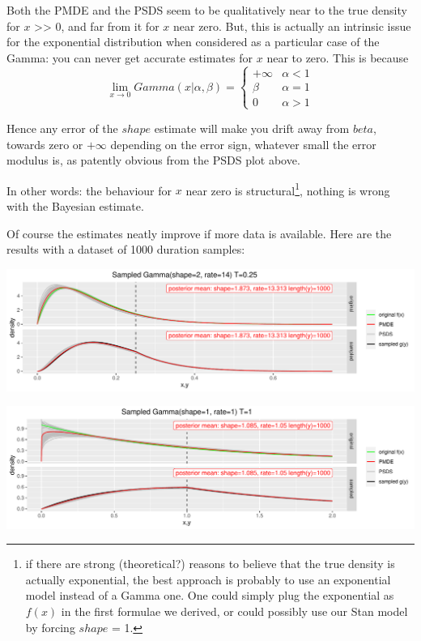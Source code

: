 \documentclass[]{article}
\begin{document}
Both the PMDE and the PSDS seem to be qualitatively near to the true
density for \(x\) \textgreater{}\textgreater{} 0, and far from it for
\(x\) near zero. But, this is actually an intrinsic issue for the
exponential distribution when considered as a particular case of the
Gamma: you can never get accurate estimates for \(x\) near to zero. This
is because \[
    \lim_{x \to 0} Gamma(x | \alpha,\beta) = \begin{cases}
      +\infty & \alpha < 1 \\
      \beta & \alpha = 1 \\
      0 & \alpha > 1
    \end{cases}
\]

Hence any error of the \(shape\) estimate will make you drift away from
\(beta\), towards zero or \(+\infty\) depending on the error sign,
whatever small the error modulus is, as patently obvious from the PSDS
plot above.

In other words: the behaviour for \(x\) near zero is
structural\footnote{if there are strong (theoretical?) reasons to
  believe that the true density is actually exponential, the best
  approach is probably to use an exponential model instead of a Gamma
  one. One could simply plug the exponential as \(f(x)\) in the first
  formulae we derived, or could possibly use our Stan model by forcing
  \(shape\) = 1.}, nothing is wrong with the Bayesian estimate.

Of course the estimates neatly improve if more data is available. Here
are the results with a dataset of 1000 duration samples:

\begin{center}\includegraphics[width=1.0\textwidth]{sampling_event_duration_files/figure-latex/stan_inference_plot1_bis-1} \end{center}

\begin{center}\includegraphics[width=1.0\textwidth]{sampling_event_duration_files/figure-latex/stan_inference_plot2_bis-1} \end{center}
\end{document}
